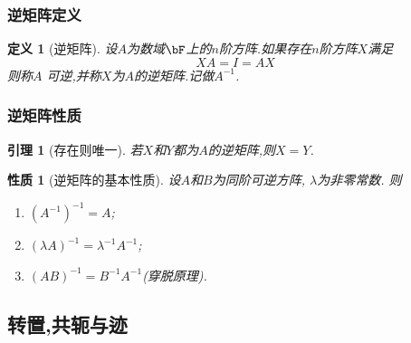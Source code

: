 \documentclass{article}
\newtheorem{proposition}[theorem]{性质}  %
\newtheorem{definition}[theorem]{定义}
\newtheorem{lemma}[theorem]{引理}
\renewcommand{\blue }[1]{{\textcolor[rgb]{0,0,1}{#1}}}
\begin{document}
\subsubsection{逆矩阵定义}
\begin{definition}[逆矩阵]
设$A$为数域$\bF$上的$n$阶方阵.如果存在$n$阶方阵$X$满足
\[XA=I=AX\]
则称$A$ \blue{可逆},并称$X$为$A$的\blue{逆矩阵}.记做$A^{-1}$.
\end{definition}

\subsubsection{逆矩阵性质}
\begin{lemma}[存在则唯一]
若$X$和$Y$都为$A$的逆矩阵,则$X=Y$.
\end{lemma}
\begin{proposition}[逆矩阵的基本性质]设$A$和$B$为同阶可逆方阵, $\lambda$为非零常数. 则
\begin{enumerate}
\item $(A^{-1})^{-1}=A$;
\item $(\lambda A)^{-1}=\lambda^{-1}A^{-1}$;
\item $(AB)^{-1}=B^{-1}A^{-1}$(穿脱原理).
\end{enumerate}
\end{proposition}


\subsection{转置,共轭与迹}
\end{document}
